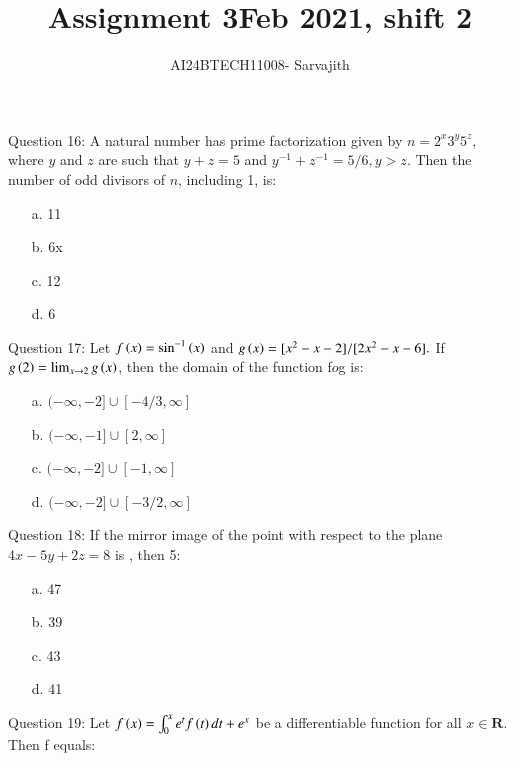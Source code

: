 \documentclass[journal]{IEEEtran}
\begin{document}

\vspace{3cm}


\author{AI24BTECH11008- Sarvajith
}
\title{Assignment 3}
{\let\newpage\relax\maketitle}
\title{Feb 2021, shift 2}
\renewcommand{\thefigure}{\theenumi}
\renewcommand{\thetable}{\theenumi}
\setlength{\intextsep}{10pt} %
\renewcommand{\thetable}{\theenumi}
Question 16: A natural number has prime factorization given by $n = 2^x3^y5^z$, where $y$ and $z$ are such that $y + z = 5$ and $y^{-1} + z^{-1} = 5/6, y>z$. Then the number of odd divisors of $n$, including 1, is:
\begin{enumerate}
    \item [a.] 11
    \item [b.] 6x
    \item [c.] 12
    \item [d.] 6   
\end{enumerate}
Question 17: Let $f\left(x\right) = \sin ^{-1} \left(x\right)$ and $g\left(x\right) = [x^2-x-2]/[2x^2-x-6].$ If $g\left(2\right) =\lim_{x\rightarrow2}g\left(x\right)$, then the domain of the function f$o$g is:
\begin{enumerate}
    \item [a.] $(-\infty,-2]\cup[-4/3,\infty]$
    \item [b.] $(-\infty,-1]\cup[2,\infty]$
    \item [c.] $(-\infty,-2]\cup[-1,\infty]$
    \item [d.] $(-\infty,-2]\cup[-3/2,\infty]$
\end{enumerate}
Question 18: If the mirror image of the point  with respect to the plane $4x-5y+2z=8$ is \brak{\alpha,\beta,\gamma}, then
5\brak{\alpha+\beta+\gamma}:
\begin{enumerate}
    \item [a.] 47
    \item [b.] 39
    \item [c.] 43
    \item [d.] 41  
\end{enumerate}
Question 19: Let $f\left(x\right)=\int_0 ^x e^t f\left(t\right)dt + e^x $ be a differentiable function for all $x\in \mathbf{R}$. Then f equals:
\end{document}
